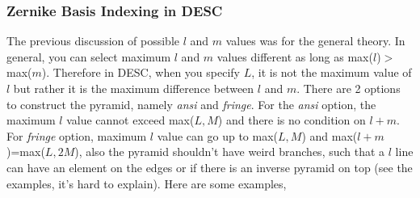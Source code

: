\subsubsection{Zernike Basis Indexing in DESC}
The previous discussion of possible $l$ and $m$ values was for the general theory. In general, you can select maximum $l$ and $m$ values different as long as max($l$)$>$max($m$). Therefore in DESC, when you specify $L$, it is not the maximum value of $l$ but rather it is the maximum difference between $l$ and $m$. There are 2 options to construct the pyramid, namely \textit{ansi} and \textit{fringe}. For the \textit{ansi} option, the maximum $l$ value cannot exceed max($L,M$) and there is no condition on $l+m$. For \textit{fringe} option, maximum $l$ value can go up to max($L,M$) and max($l+m$)=max($L,2M$), also the pyramid shouldn't have weird branches, such that a $l$ line can have an element on the edges or if there is an inverse pyramid on top (see the examples, it's hard to explain). Here are some examples,
